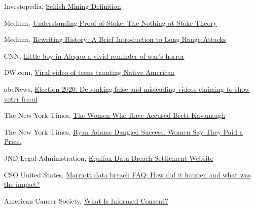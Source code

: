 \documentclass[target=mst,aauheader=]{thud}
\begin{document}
\begin{thebibliography}{99}
    Investopedia, \href{https://www.investopedia.com/terms/s/selfish-mining.asp}{Selfish Mining Definition}

    Medium, \href{https://medium.com/coinmonks/understanding-proof-of-stake-the-nothing-at-stake-theory-1f0d71bc027}{Understanding Proof of Stake: The Nothing at Stake Theory}

    Medium, \href{https://blog.positive.com/rewriting-history-a-brief-introduction-to-long-range-attacks-54e473acdba9}{Rewriting History: A Brief Introduction to Long Range Attacks}


    CNN, \href{https://edition.cnn.com/2016/08/17/world/syria-little-boy-airstrike-victim/index.html}{Little boy in Aleppo a vivid reminder of war’s horror}

    DW.com, \href{https://www.dw.com/en/outrage-as-teens-mock-native-american-at-washington-rally/a-47156592}{Viral video of teens taunting Native American}

    abcNews, \href{https://abcnews.go.com/Politics/election-2020-debunking-false-misleading-videos-claiming-show/story?id=74148233}{Election 2020: Debunking false and misleading videos claiming to show voter fraud}

    The New York Times, \href{https://www.nytimes.com/2018/09/26/us/politics/brett-kavanaugh-accusers-women.html}{The Women Who Have Accused Brett Kavanaugh}

    The New York Times, \href{2019, a journalist from the New York Times conducted an interview with a woman who accused the musician Ryan Adams of sexual misconduct}{Ryan Adams Dangled Success. Women Say They Paid a Price.}

    JND Legal Administration, \href{https://www.equifaxbreachsettlement.com/}{Equifax Data Breach Settlement Website}

    CSO United States, \href{https://www.csoonline.com/article/3441220/marriott-data-breach-faq-how-did-it-happen-and-what-was-the-impact.html}{Marriott data breach FAQ: How did it happen and what was the impact?}
    
    American Cancer Society, \href{https://www.cancer.org/treatment/treatments-and-side-effects/planning-managing/informed-consent/what-is-informed-consent.html}{What Is Informed Consent?}
    

\end{thebibliography}
\end{document}
